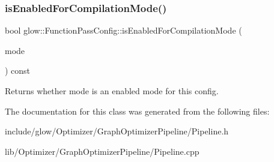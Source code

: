 \subsubsection{\texorpdfstring{is\+Enabled\+For\+Compilation\+Mode()}{isEnabledForCompilationMode()}}
{\footnotesize\ttfamily bool glow\+::\+Function\+Pass\+Config\+::is\+Enabled\+For\+Compilation\+Mode (\begin{DoxyParamCaption}\item[{\hyperlink{structglow_1_1_compilation_context_a92efb87746c0edf7756b84fdcd87014a}{Compilation\+Mode}}]{mode }\end{DoxyParamCaption}) const\hspace{0.3cm}{\ttfamily [inline]}}

\begin{DoxyReturn}{Returns}
whether {\ttfamily mode} is an enabled mode for this config. 
\end{DoxyReturn}


The documentation for this class was generated from the following files\+:\begin{DoxyCompactItemize}
\item 
include/glow/\+Optimizer/\+Graph\+Optimizer\+Pipeline/Pipeline.\+h\item 
lib/\+Optimizer/\+Graph\+Optimizer\+Pipeline/Pipeline.\+cpp\end{DoxyCompactItemize}
